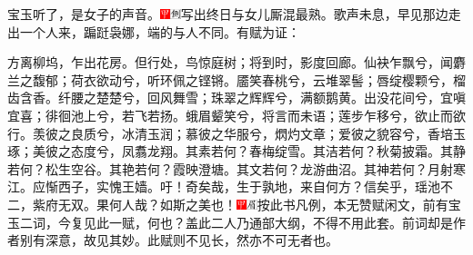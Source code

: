 宝玉听了，是女子的声音。{\includegraphics[width=3mm]{../Images/00002}\includegraphics[width=3mm]{../Images/00011}\footnotesize \kaishu 写出终日与女儿厮混最熟。}歌声未息，早见那边走出一个人来，蹁跹袅娜，端的与人不同。有赋为证：

方离柳坞，乍出花房。但行处，鸟惊庭树；将到时，影度回廊。仙袂乍飘兮，闻麝兰之馥郁；荷衣欲动兮，听环佩之铿锵。靥笑春桃兮，云堆翠髻；唇绽樱颗兮，榴齿含香。纤腰之楚楚兮，回风舞雪；珠翠之辉辉兮，满额鹅黄。出没花间兮，宜嗔宜喜；徘徊池上兮，若飞若扬。蛾眉颦笑兮，将言而未语；莲步乍移兮，欲止而欲行。羡彼之良质兮，冰清玉润；慕彼之华服兮，熌灼文章；爱彼之貌容兮，香培玉琢；美彼之态度兮，凤翥龙翔。其素若何？春梅绽雪。其洁若何？秋菊披霜。其静若何？松生空谷。其艳若何？霞映澄塘。其文若何？龙游曲沼。其神若何？月射寒江。应惭西子，实愧王嫱。吁！奇矣哉，生于孰地，来自何方？信矣乎，瑶池不二，紫府无双。果何人哉？如斯之美也！{\includegraphics[width=3mm]{../Images/00002}\includegraphics[width=3mm]{../Images/00010}\footnotesize \kaishu 按此书凡例，本无赞赋闲文，前有宝玉二词，今复见此一赋，何也？盖此二人乃通部大纲，不得不用此套。前词却是作者别有深意，故见其妙。此赋则不见长，然亦不可无者也。}


